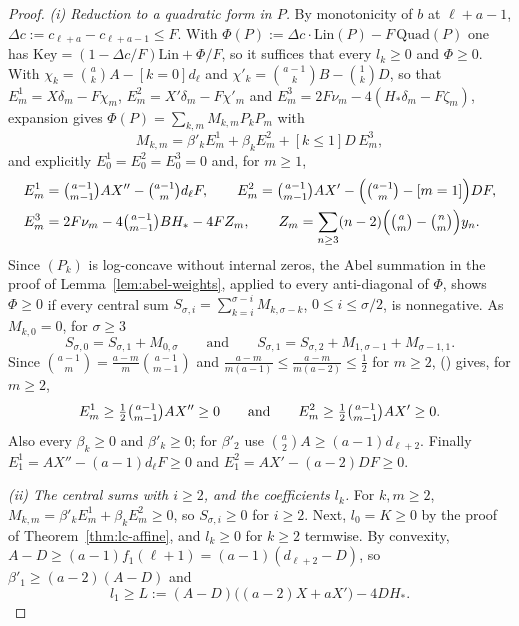 \documentclass[twoside,10pt]{article}
\numberwithin{equation}{section}
\theoremstyle{slbody}
\theoremstyle{definition}
\theoremstyle{remark}
\renewcommand{\eqref}[1]{\textup{{\normalfont(\oldstylenums{\ref{#1}}}\normalfont)}}
\begin{document}
\begin{proof}
\emph{(i) Reduction to a quadratic form in $P$.} By monotonicity of $b$ at $\ell+a-1$, $\Delta c:=c_{\ell+a}-c_{\ell+a-1}\leq F$. With $\Phi(P):=\Delta c\cdot\mathrm{Lin}(P)-F\,\mathrm{Quad}(P)$ one has $\mathrm{Key}=(1-\Delta c/F)\mathrm{Lin}+\Phi/F$, so it suffices that every $l_k\geq0$ and $\Phi\geq0$. With $\chi_k=\binom akA-[k=0]d_\ell$ and $\chi'_k=\binom{a-1}kB-\binom1kD$, so that $E^1_m=X\delta_m-F\chi_m$, $E^2_m=X'\delta_m-F\chi'_m$ and $E^3_m=2F\nu_m-4(H_*\delta_m-F\zeta_m)$, expansion gives $\Phi(P)=\sum_{k,m}M_{k,m}P_kP_m$ with
\[
M_{k,m}=\beta'_kE^1_m+\beta_kE^2_m+[k\leq1]D\,E^3_m,
\]
and explicitly $E^1_0=E^2_0=E^3_0=0$ and, for $m\geq1$,
\[
\begin{aligned}
E^1_m&=\tbinom{a-1}{m-1}AX''-\tbinom{a-1}md_\ell F,\qquad E^2_m=\tbinom{a-1}{m-1}AX'-\Bigl(\tbinom{a-1}m-[m=1]\Bigr)DF,\\
E^3_m&=2F\nu_m-4\tbinom{a-1}{m-1}BH_*-4FZ_m,\qquad Z_m=\sum_{n\geq3}(n-2)\Bigl(\tbinom am-\tbinom nm\Bigr)y_n.
\end{aligned}
\]
Since $(P_k)$ is log-concave without internal zeros, the Abel summation in the proof of Lemma~\ref{lem:abel-weights}, applied to every anti-diagonal of $\Phi$, shows $\Phi\geq0$ if every central sum $S_{\sigma,i}=\sum_{k=i}^{\sigma-i}M_{k,\sigma-k}$, $0\leq i\leq\sigma/2$, is nonnegative. As $M_{k,0}=0$, for $\sigma\geq3$
\[
S_{\sigma,0}=S_{\sigma,1}+M_{0,\sigma}\qquad\text{and}\qquad S_{\sigma,1}=S_{\sigma,2}+M_{1,\sigma-1}+M_{\sigma-1,1}.
\]
Since $\binom{a-1}m=\frac{a-m}m\binom{a-1}{m-1}$ and $\frac{a-m}{m(a-1)}\leq\frac{a-m}{m(a-2)}\leq\frac12$ for $m\geq2$, \eqref{eq:G-basic} gives, for $m\geq2$,
\[
E^1_m\geq\tfrac12\tbinom{a-1}{m-1}AX''\geq0\qquad\text{and}\qquad E^2_m\geq\tfrac12\tbinom{a-1}{m-1}AX'\geq0.
\]
Also every $\beta_k\geq0$ and $\beta'_k\geq0$; for $\beta'_2$ use $\binom a2A\geq(a-1)d_{\ell+2}$. Finally $E^1_1=AX''-(a-1)d_\ell F\geq0$ and $E^2_1=AX'-(a-2)DF\geq0$.

\emph{(ii) The central sums with $i\geq2$, and the coefficients $l_k$.} For $k,m\geq2$, $M_{k,m}=\beta'_kE^1_m+\beta_kE^2_m\geq0$, so $S_{\sigma,i}\geq0$ for $i\geq2$. Next, $l_0=K\geq0$ by the proof of Theorem~\ref{thm:lc-affine}, and $l_k\geq0$ for $k\geq2$ termwise. By convexity, $A-D\geq(a-1)f_1(\ell+1)=(a-1)(d_{\ell+2}-D)$, so $\beta'_1\geq(a-2)(A-D)$ and
\[
l_1\geq L:=(A-D)\bigl((a-2)X+aX'\bigr)-4DH_*.
\]


\end{proof}
\end{document}
